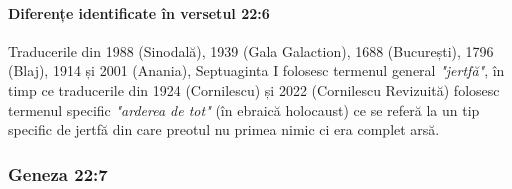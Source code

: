 \documentclass[12pt,a4paper]{article}
\begin{document}
\paragraph{Diferențe identificate în versetul 22:6}
Traducerile din 1988 (Sinodală), 1939 (Gala Galaction), 1688 (București), 1796 (Blaj), 1914 și 2001 (Anania), Septuaginta I folosesc termenul general
\emph{"jertfă"}, în timp ce traducerile din 1924 (Cornilescu) și 2022 (Cornilescu Revizuită) folosesc termenul specific \emph{"arderea de tot"} (în ebraică holocaust) ce se referă la un tip specific de jertfă din care preotul nu primea nimic ci era complet arsă.


\subsubsection{Geneza 22:7}
\end{document}
